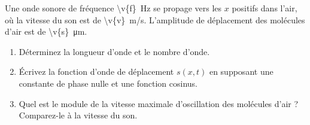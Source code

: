 Une onde sonore de fréquence \qty{\v{f}}{Hz} se propage vers les $x$ positifs dans l'air, où la vitesse du son est de \qty{\v{v}}{m/s}. L'amplitude de déplacement des molécules d'air est de \qty{\v{s}}{\micro\metre}.

\begin{enumerate}[label=\alph*)]
    \item Déterminez la longueur d'onde et le nombre d'onde.
    \item Écrivez la fonction d'onde de déplacement $s(x,t)$ en supposant une constante de phase nulle et une fonction cosinus.
    \item Quel est le module de la vitesse maximale d'oscillation des molécules d'air ? Comparez-le à la vitesse du son.
\end{enumerate}
